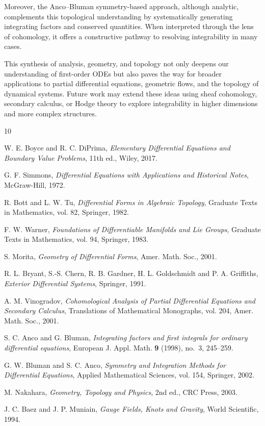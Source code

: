 \documentclass{amsart}
\theoremstyle{definition}
\theoremstyle{remark}
\numberwithin{equation}{section}
\begin{document}
Moreover, the Anco--Bluman symmetry-based approach, although analytic, complements this topological understanding by systematically generating integrating factors and conserved quantities. When interpreted through the lens of cohomology, it offers a constructive pathway to resolving integrability in many cases.

This synthesis of analysis, geometry, and topology not only deepens our understanding of first-order ODEs but also paves the way for broader applications to partial differential equations, geometric flows, and the topology of dynamical systems. Future work may extend these ideas using sheaf cohomology, secondary calculus, or Hodge theory to explore integrability in higher dimensions and more complex structures.


\begin{thebibliography}{10}

 W. E. Boyce and R. C. DiPrima, \textit{Elementary Differential Equations and Boundary Value Problems}, 11th ed., Wiley, 2017.

 G. F. Simmons, \textit{Differential Equations with Applications and Historical Notes}, McGraw-Hill, 1972.

 R. Bott and L. W. Tu, \textit{Differential Forms in Algebraic Topology}, Graduate Texts in Mathematics, vol. 82, Springer, 1982.

 F. W. Warner, \textit{Foundations of Differentiable Manifolds and Lie Groups}, Graduate Texts in Mathematics, vol. 94, Springer, 1983.

 S. Morita, \textit{Geometry of Differential Forms}, Amer. Math. Soc., 2001.

 R. L. Bryant, S.-S. Chern, R. B. Gardner, H. L. Goldschmidt and P. A. Griffiths, \textit{Exterior Differential Systems}, Springer, 1991.

 A. M. Vinogradov, \textit{Cohomological Analysis of Partial Differential Equations and Secondary Calculus}, Translations of Mathematical Monographs, vol. 204, Amer. Math. Soc., 2001.

 S. C. Anco and G. Bluman, \textit{Integrating factors and first integrals for ordinary differential equations}, European J. Appl. Math. \textbf{9} (1998), no.~3, 245--259.

 G. W. Bluman and S. C. Anco, \textit{Symmetry and Integration Methods for Differential Equations}, Applied Mathematical Sciences, vol. 154, Springer, 2002.

 M. Nakahara, \textit{Geometry, Topology and Physics}, 2nd ed., CRC Press, 2003.

 J. C. Baez and J. P. Muniain, \textit{Gauge Fields, Knots and Gravity}, World Scientific, 1994.

\end{thebibliography}
\end{document}
